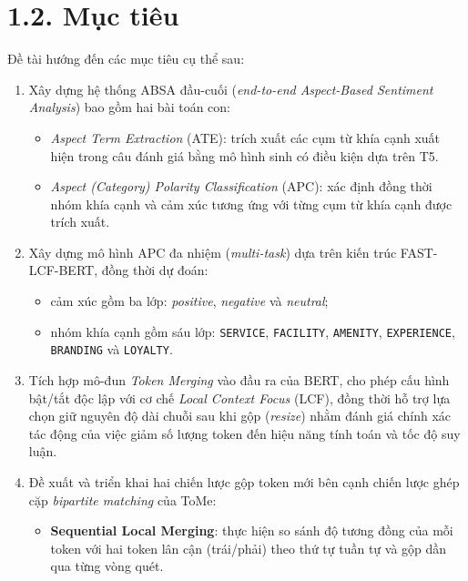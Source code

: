 \section{1.2. Mục tiêu}
 
Đề tài hướng đến các mục tiêu cụ thể sau:

\begin{enumerate}

    \item Xây dựng hệ thống ABSA đầu-cuối (\textit{end-to-end Aspect-Based Sentiment Analysis}) bao gồm hai bài toán con:
    \begin{itemize}
        \item \textit{Aspect Term Extraction} (ATE): trích xuất các cụm từ khía cạnh xuất hiện trong câu đánh giá bằng mô hình sinh có điều kiện dựa trên T5.
        \item \textit{Aspect (Category) Polarity Classification} (APC): xác định đồng thời nhóm khía cạnh và cảm xúc tương ứng với từng cụm từ khía cạnh được trích xuất.
    \end{itemize}

    \item Xây dựng mô hình APC đa nhiệm (\textit{multi-task}) dựa trên kiến trúc FAST-LCF-BERT, đồng thời dự đoán:
    \begin{itemize}
        \item cảm xúc gồm ba lớp: \textit{positive}, \textit{negative} và \textit{neutral};
        \item nhóm khía cạnh gồm sáu lớp: \texttt{SERVICE}, \texttt{FACILITY}, \texttt{AMENITY}, \texttt{EXPERIENCE}, \texttt{BRANDING} và \texttt{LOYALTY}.
    \end{itemize}

    \item Tích hợp mô-đun \textit{Token Merging} vào đầu ra của BERT, cho phép cấu hình bật/tắt độc lập với cơ chế \textit{Local Context Focus} (LCF), đồng thời hỗ trợ lựa chọn giữ nguyên độ dài chuỗi sau khi gộp (\textit{resize}) nhằm đánh giá chính xác tác động của việc giảm số lượng token đến hiệu năng tính toán và tốc độ suy luận.

    \item Đề xuất và triển khai hai chiến lược gộp token mới bên cạnh chiến lược ghép cặp \textit{bipartite matching} của ToMe:
    \begin{itemize}
        \item \textbf{Sequential Local Merging}: thực hiện so sánh độ tương đồng của mỗi token với hai token lân cận (trái/phải) theo thứ tự tuần tự và gộp dần qua từng vòng quét.
        

\end{itemize}
\end{enumerate}
